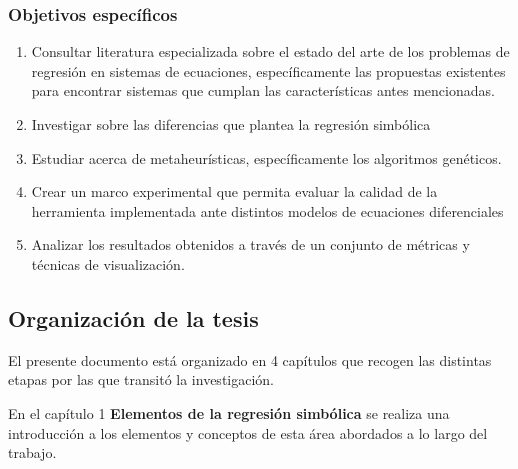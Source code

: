 \subsubsection*{Objetivos específicos}

\begin{enumerate}
    \item Consultar literatura especializada sobre el estado del arte de los problemas de regresión en sistemas de ecuaciones, específicamente las propuestas existentes para encontrar sistemas que cumplan las características antes mencionadas.
    \item Investigar sobre las diferencias que plantea la regresión simbólica
    \item Estudiar acerca de metaheurísticas, específicamente los algoritmos genéticos.
    \item Crear un marco experimental que permita evaluar la calidad de la herramienta implementada ante distintos modelos de ecuaciones diferenciales
    \item Analizar los resultados obtenidos a través de un conjunto de métricas y técnicas de visualización.
\end{enumerate}

\subsection*{Organización de la tesis}

El presente documento está organizado en 4 capítulos que recogen las
distintas etapas por las que transitó la investigación.

En el capítulo 1 \textbf{Elementos de la regresión simbólica} se realiza una
introducción a los elementos y conceptos de esta área abordados a lo largo
del trabajo.
